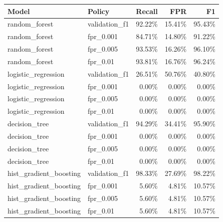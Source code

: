 \begin{tabular}{llrrr}
Model & Policy & Recall & FPR & F1 \\
\hline
random\_forest & validation\_f1 & 92.22\% & 15.41\% & 95.43\% \\
random\_forest & fpr\_0.001 & 84.71\% & 14.80\% & 91.22\% \\
random\_forest & fpr\_0.005 & 93.53\% & 16.26\% & 96.10\% \\
random\_forest & fpr\_0.01 & 93.81\% & 16.76\% & 96.24\% \\
logistic\_regression & validation\_f1 & 26.51\% & 50.76\% & 40.80\% \\
logistic\_regression & fpr\_0.001 & 0.00\% & 0.00\% & 0.00\% \\
logistic\_regression & fpr\_0.005 & 0.00\% & 0.00\% & 0.00\% \\
logistic\_regression & fpr\_0.01 & 0.00\% & 0.00\% & 0.00\% \\
decision\_tree & validation\_f1 & 94.29\% & 34.41\% & 95.90\% \\
decision\_tree & fpr\_0.001 & 0.00\% & 0.00\% & 0.00\% \\
decision\_tree & fpr\_0.005 & 0.00\% & 0.00\% & 0.00\% \\
decision\_tree & fpr\_0.01 & 0.00\% & 0.00\% & 0.00\% \\
hist\_gradient\_boosting & validation\_f1 & 98.33\% & 27.69\% & 98.22\% \\
hist\_gradient\_boosting & fpr\_0.001 & 5.60\% & 4.81\% & 10.57\% \\
hist\_gradient\_boosting & fpr\_0.005 & 5.60\% & 4.81\% & 10.57\% \\
hist\_gradient\_boosting & fpr\_0.01 & 5.60\% & 4.81\% & 10.57\% \\
\end{tabular}
